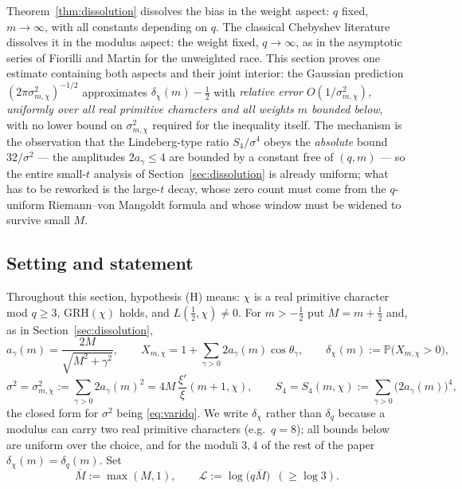 Theorem~\ref{thm:dissolution} dissolves the bias in the weight aspect:
$q$ fixed, $m\to\infty$, with all constants depending on $q$. The
classical Chebyshev literature dissolves it in the modulus aspect: the
weight fixed, $q\to\infty$, as in the asymptotic series of Fiorilli and
Martin \cite{FM13} for the unweighted race. This section proves one
estimate containing both aspects and their joint interior: the Gaussian
prediction $(2\pi\sigma_{m,\chi}^2)^{-1/2}$ approximates
$\delta_\chi(m)-\tfrac12$ with \emph{relative error
$O(1/\sigma_{m,\chi}^2)$, uniformly over all real primitive characters
and all weights $m$ bounded below}, with no lower bound on
$\sigma_{m,\chi}^2$ required for the inequality itself. The mechanism
is the observation that the Lindeberg-type ratio $S_4/\sigma^4$ obeys
the \emph{absolute} bound $32/\sigma^2$ --- the amplitudes
$2a_\gamma\le4$ are bounded by a constant free of $(q,m)$ --- so the
entire small-$t$ analysis of Section~\ref{sec:dissolution} is already
uniform; what has to be reworked is the large-$t$ decay, whose zero
count must come from the $q$-uniform Riemann--von Mangoldt formula and
whose window must be widened to survive small $M$.

\subsection*{Setting and statement}

Throughout this section, hypothesis (H) means: $\chi$ is a real
primitive character mod $q\ge3$, GRH$(\chi)$ holds, and
$L(\tfrac12,\chi)\ne0$. For $m>-\tfrac12$ put $M=m+\tfrac12$ and, as in
Section~\ref{sec:dissolution},
\[
a_\gamma(m)=\frac{2M}{\sqrt{M^2+\gamma^2}},\qquad
X_{m,\chi}=1+\sum_{\gamma>0}2a_\gamma(m)\cos\theta_\gamma,\qquad
\delta_\chi(m):=\mathbb P\bigl(X_{m,\chi}>0\bigr),
\]
\[
\sigma^2=\sigma_{m,\chi}^2:=\sum_{\gamma>0}2a_\gamma(m)^2
=4M\,\frac{\xi'}{\xi}(m+1,\chi),
\qquad
S_4=S_4(m,\chi):=\sum_{\gamma>0}\bigl(2a_\gamma(m)\bigr)^4,
\]
the closed form for $\sigma^2$ being \eqref{eq:varidq}. We write
$\delta_\chi$ rather than $\delta_q$ because a modulus can carry two
real primitive characters (e.g.\ $q=8$); all bounds below are uniform
over the choice, and for the moduli $3,4$ of the rest of the paper
$\delta_\chi(m)=\delta_q(m)$. Set
\[
\overline M:=\max(M,1),\qquad
\mathcal L:=\log\bigl(q\overline M\bigr)\;\ (\ge\log3).
\]

